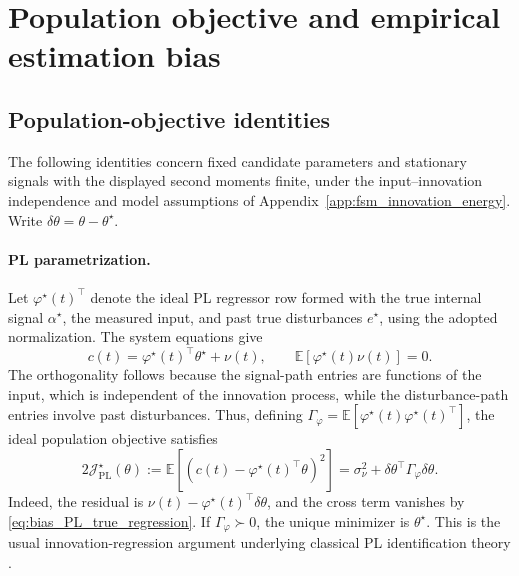 
\section{Population objective and empirical estimation bias}
\label{app:ws_bias_analysis}

\subsection{Population-objective identities}
\label{app:ws_bias_population}

The following identities concern fixed candidate parameters and stationary
signals with the displayed second moments finite, under the
input--innovation independence and model assumptions of
Appendix~\ref{app:fsm_innovation_energy}.
Write $\delta\theta=\theta-\theta^\star$.

\paragraph{PL parametrization.}
Let $\varphi^\star(t)^\top$ denote the ideal PL regressor row formed with
the true internal signal $\alpha^\star$, the measured input, and past
true disturbances $e^\star$, using the adopted normalization. The system
equations give
\begin{equation}
\label{eq:bias_PL_true_regression}
 c(t)=\varphi^\star(t)^\top\theta^\star+\nu(t),
 \qquad
 \mathbb E[\varphi^\star(t)\nu(t)]=0.
\end{equation}
The orthogonality follows because the signal-path entries are functions
of the input, which is independent of the innovation process, while the
disturbance-path entries involve past disturbances. Thus, defining
$\Gamma_\varphi=\mathbb E[\varphi^\star(t)\varphi^\star(t)^\top]$, the
ideal population objective satisfies
\begin{equation}
\label{eq:bias_population_PL}
 2\mathcal J_{\mathrm{PL}}^\star(\theta)
 :=\mathbb E[(c(t)-\varphi^\star(t)^\top\theta)^2]
 =\sigma_\nu^2+\delta\theta^\top\Gamma_\varphi\delta\theta.
\end{equation}
Indeed, the residual is
$\nu(t)-\varphi^\star(t)^\top\delta\theta$, and the cross term
vanishes by \eqref{eq:bias_PL_true_regression}.
If $\Gamma_\varphi\succ0$, the unique minimizer is $\theta^\star$.
This is the usual innovation-regression argument underlying classical
PL identification theory \cite{LjungSoderstrom1983}.

